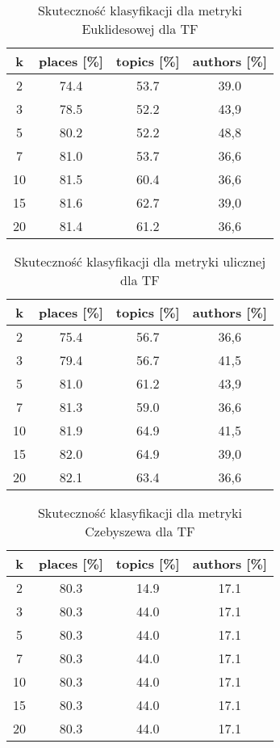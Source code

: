 \documentclass{classrep}
\begin{document}
\begin{table}[H]
	\centering
	\begin{tabular}{c c c c} 
		\hline
		\textbf{k} & \textbf{places [\%]} & \textbf{topics [\%]} &  \textbf{authors [\%]} \\ [0.5ex] 
		\hline
		\hline 
		2 & 74.4 & 53.7 & 39.0 \\ 
		3 & 78.5 & 52.2 & 43,9 \\
		5 & 80.2 & 52.2 & 48,8 \\
		7 & 81.0 & 53.7 & 36,6 \\
		10 & 81.5 & 60.4 & 36,6 \\
		15 & 81.6 & 62.7 & 39,0 \\
		20 & 81.4 & 61.2 & 36,6 \\ 
		\hline
	\end{tabular}
	\caption{Skuteczność klasyfikacji dla metryki Euklidesowej dla TF}
\end{table}

\begin{table}[H]
	\centering
	\begin{tabular}{c c c c} 
		\hline
		\textbf{k} & \textbf{places [\%]} & \textbf{topics [\%]} &  \textbf{authors [\%]} \\ [0.5ex] 
		\hline
		\hline 
		2 & 75.4 & 56.7 & 36,6 \\ 
		3 & 79.4 & 56.7 & 41,5 \\
		5 & 81.0 & 61.2 & 43,9 \\
		7 & 81.3 & 59.0 & 36,6 \\
		10 & 81.9 & 64.9 & 41,5 \\
		15 & 82.0 & 64.9 & 39,0 \\
		20 & 82.1 & 63.4 & 36,6 \\ 
		\hline
	\end{tabular}
	\caption{Skuteczność klasyfikacji dla metryki ulicznej dla TF}
\end{table}

\begin{table}[H]
	\centering
	\begin{tabular}{c c c c} 
		\hline
		\textbf{k} & \textbf{places [\%]} & \textbf{topics [\%]} &  \textbf{authors [\%]} \\ [0.5ex] 
		\hline
		\hline 
		2 & 80.3 & 14.9 & 17.1 \\ 
		3 & 80.3 & 44.0 & 17.1 \\
		5 & 80.3 & 44.0 & 17.1 \\
		7 & 80.3 & 44.0 & 17.1 \\
		10 & 80.3 & 44.0 & 17.1 \\
		15 & 80.3 & 44.0 & 17.1 \\
		20 & 80.3 & 44.0 & 17.1 \\ 
		\hline
	\end{tabular}
	\caption{Skuteczność klasyfikacji dla metryki Czebyszewa dla TF}
\end{table}
\end{document}
